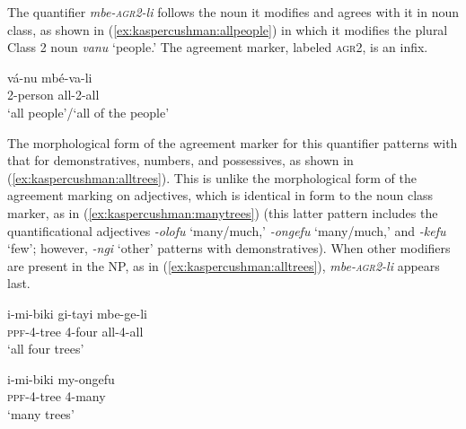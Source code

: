 \documentclass[output=paper,modfonts,nonflat]{langsci/langscibook}
\begin{document}
 The quantifier \emph{mbe-\textsc{agr2}-li} follows the noun it modifies and agrees with it in noun class, as shown in (\ref{ex:kaspercushman:allpeople}) in which it modifies the plural Class 2 noun \textit{vanu} `people.' The agreement marker, labeled \textsc{agr2}, is an infix.  

\begin{exe}
\ex 
\gll vá-nu mbé-va-li \label{ex:kaspercushman:allpeople} \\
2-person all-2-all \\
\glt `all people'/`all of the people'\footnotemark \\

\end{exe}

The morphological form of the agreement marker for this quantifier patterns with that for demonstratives, numbers, and possessives, as shown in (\ref{ex:kaspercushman:alltrees}).  This is unlike the morphological form of the agreement marking on adjectives, which is identical in form to the noun class marker, as in (\ref{ex:kaspercushman:manytrees}) (this latter pattern includes the quantificational adjectives \textit{-olofu} `many/much,' \textit{-ongefu} `many/much,' and \textit{-kefu} `few'; however, \textit{-ngi} `other' patterns with demonstratives). When other modifiers are present in the NP, as in (\ref{ex:kaspercushman:alltrees}),   \textit{mbe-\textsc{agr2}-li} appears last.


\begin{exe}

\ex\begin{xlist}

\ex 
\gll i-mi-biki gi-tayi mbe-ge-li\\ 
\textsc{ppf}-4-tree 4-four all-4-all\\
\glt `all four trees' \\ \label{ex:kaspercushman:alltrees}

\ex 
\gll i-mi-biki my-ongefu\\
\textsc{ppf}-4-tree 4-many \\
\glt `many trees' \label{ex:kaspercushman:ex:kaspercushman:manytrees}

\end{xlist}

\end{exe}
\end{document}
